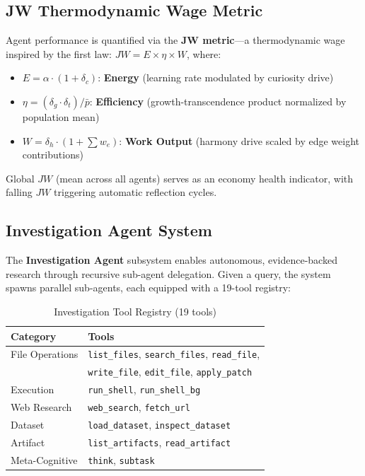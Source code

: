 \documentclass[11pt]{article}
\begin{document}
\subsection{JW Thermodynamic Wage Metric}

Agent performance is quantified via the \textbf{JW metric}---a thermodynamic
wage inspired by the first law: $JW = E \times \eta \times W$, where:
\begin{itemize}[noitemsep,topsep=4pt]
  \item $E = \alpha \cdot (1 + \delta_c)$: \textbf{Energy} (learning rate
        modulated by curiosity drive)
  \item $\eta = (\delta_g \cdot \delta_t) / \bar{p}$: \textbf{Efficiency}
        (growth-transcendence product normalized by population mean)
  \item $W = \delta_h \cdot (1 + \sum w_e)$: \textbf{Work Output} (harmony
        drive scaled by edge weight contributions)
\end{itemize}
Global $JW$ (mean across all agents) serves as an economy health indicator,
with falling $JW$ triggering automatic reflection cycles.

\subsection{Investigation Agent System}
\label{sec:investigation}

The \textbf{Investigation Agent} subsystem enables autonomous, evidence-backed
research through recursive sub-agent delegation. Given a query, the system
spawns parallel sub-agents, each equipped with a 19-tool registry:

\begin{table}[H]
\centering
\caption{Investigation Tool Registry (19 tools)}
\label{tab:investigation_tools}
\small
{}
\begin{tabular}{ll}
\toprule
\textbf{Category} & \textbf{Tools} \\
\midrule
File Operations & \texttt{list\_files}, \texttt{search\_files}, \texttt{read\_file}, \\
                & \texttt{write\_file}, \texttt{edit\_file}, \texttt{apply\_patch} \\
Execution       & \texttt{run\_shell}, \texttt{run\_shell\_bg} \\
Web Research    & \texttt{web\_search}, \texttt{fetch\_url} \\
Dataset         & \texttt{load\_dataset}, \texttt{inspect\_dataset} \\
Artifact        & \texttt{list\_artifacts}, \texttt{read\_artifact} \\
Meta-Cognitive  & \texttt{think}, \texttt{subtask} \\
\bottomrule
\end{tabular}
\end{table}
\end{document}
